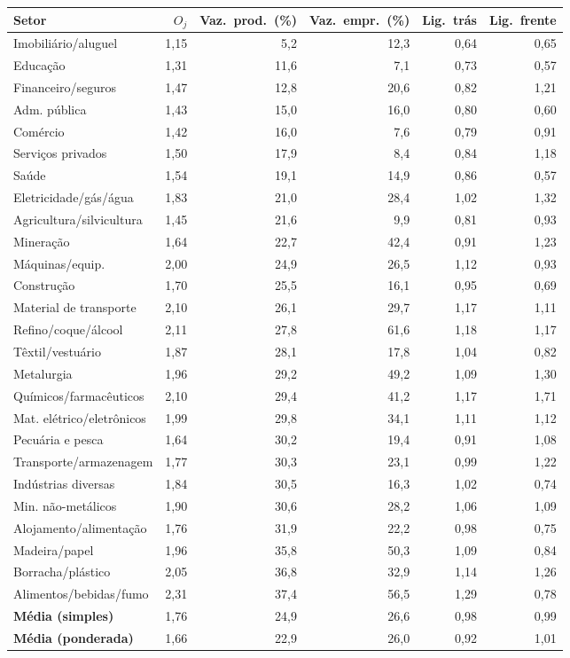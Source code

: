 \begin{tabular}{lrrrrr}
\toprule
Setor & $O_j$ & Vaz.\ prod.\ (\%) & Vaz.\ empr.\ (\%) & Lig.\ trás & Lig.\ frente\\
\midrule
Imobiliário/aluguel & 1,15 & 5,2 & 12,3 & 0,64 & 0,65\\
Educação & 1,31 & 11,6 & 7,1 & 0,73 & 0,57\\
Financeiro/seguros & 1,47 & 12,8 & 20,6 & 0,82 & 1,21\\
Adm. pública & 1,43 & 15,0 & 16,0 & 0,80 & 0,60\\
Comércio & 1,42 & 16,0 & 7,6 & 0,79 & 0,91\\
Serviços privados & 1,50 & 17,9 & 8,4 & 0,84 & 1,18\\
Saúde & 1,54 & 19,1 & 14,9 & 0,86 & 0,57\\
Eletricidade/gás/água & 1,83 & 21,0 & 28,4 & 1,02 & 1,32\\
Agricultura/silvicultura & 1,45 & 21,6 & 9,9 & 0,81 & 0,93\\
Mineração & 1,64 & 22,7 & 42,4 & 0,91 & 1,23\\
Máquinas/equip. & 2,00 & 24,9 & 26,5 & 1,12 & 0,93\\
Construção & 1,70 & 25,5 & 16,1 & 0,95 & 0,69\\
Material de transporte & 2,10 & 26,1 & 29,7 & 1,17 & 1,11\\
Refino/coque/álcool & 2,11 & 27,8 & 61,6 & 1,18 & 1,17\\
Têxtil/vestuário & 1,87 & 28,1 & 17,8 & 1,04 & 0,82\\
Metalurgia & 1,96 & 29,2 & 49,2 & 1,09 & 1,30\\
Químicos/farmacêuticos & 2,10 & 29,4 & 41,2 & 1,17 & 1,71\\
Mat. elétrico/eletrônicos & 1,99 & 29,8 & 34,1 & 1,11 & 1,12\\
Pecuária e pesca & 1,64 & 30,2 & 19,4 & 0,91 & 1,08\\
Transporte/armazenagem & 1,77 & 30,3 & 23,1 & 0,99 & 1,22\\
Indústrias diversas & 1,84 & 30,5 & 16,3 & 1,02 & 0,74\\
Min. não-metálicos & 1,90 & 30,6 & 28,2 & 1,06 & 1,09\\
Alojamento/alimentação & 1,76 & 31,9 & 22,2 & 0,98 & 0,75\\
Madeira/papel & 1,96 & 35,8 & 50,3 & 1,09 & 0,84\\
Borracha/plástico & 2,05 & 36,8 & 32,9 & 1,14 & 1,26\\
Alimentos/bebidas/fumo & 2,31 & 37,4 & 56,5 & 1,29 & 0,78\\
\midrule
\textbf{Média (simples)} & 1,76 & 24,9 & 26,6 & 0,98 & 0,99\\
\textbf{Média (ponderada)} & 1,66 & 22,9 & 26,0 & 0,92 & 1,01\\
\bottomrule
\end{tabular}
